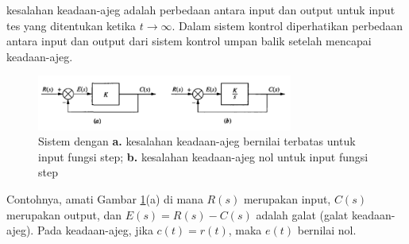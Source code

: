 kesalahan keadaan-ajeg adalah perbedaan antara input dan output untuk input tes yang ditentukan ketika $t \rightarrow \infty$. Dalam sistem kontrol diperhatikan perbedaan antara input dan output dari sistem kontrol umpan balik setelah mencapai keadaan-ajeg. \cite{ControlSystemBook}


\begin{figure}[!h]
	\centering
	\includegraphics[width=0.75\textwidth]{figures/SSEExample}
	\caption{Sistem dengan \textbf{a.} kesalahan keadaan-ajeg bernilai terbatas untuk input fungsi step; \textbf{b.} kesalahan keadaan-ajeg nol untuk input fungsi step \cite{ControlSystemBook}}
	\label{fig:3:steadystateerror}
\end{figure}

Contohnya, amati Gambar \ref{fig:3:steadystateerror}(a) di mana $R(s)$ merupakan input, $C(s)$ merupakan output, dan $E(s) = R(s) - C(s)$ adalah galat (galat keadaan-ajeg). Pada keadaan-ajeg, jika $c(t) = r(t)$, maka $e(t)$ bernilai nol.




